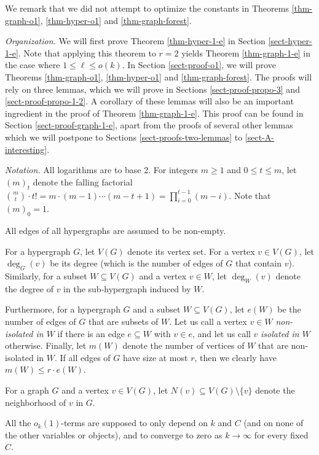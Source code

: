 We remark that we did not attempt to optimize the constants in Theorems \ref{thm-graph-o1}, \ref{thm-hyper-o1} and \ref{thm-graph-forest}.

\noindent\textit{Organization.} We will first prove Theorem \ref{thm-hyper-1-e} in Section \ref{sect-hyper-1-e}. Note that applying this theorem to $r=2$ yields Theorem \ref{thm-graph-1-e} in the case where $1\leq \ell\leq o(k)$. In Section \ref{sect-proof-o1}, we will prove Theorems \ref{thm-graph-o1}, \ref{thm-hyper-o1} and \ref{thm-graph-forest}. The proofs will rely on three lemmas, which we will prove in Sections \ref{sect-proof-propo-3} and \ref{sect-proof-propo-1-2}. A corollary of these lemmas will also be an important ingredient in the proof of Theorem \ref{thm-graph-1-e}. This proof can be found in Section \ref{sect-proof-graph-1-e}, apart from the proofs of several other lemmas which we will postpone to Sections \ref{sect-proofs-two-lemmas} to \ref{sect-A-interesting}.

\noindent\textit{Notation.} All logarithms are to base 2. For integers $m\geq 1$ and $0\leq t\leq m$, let $(m)_t$ denote the falling factorial ${m\choose t}\cdot t!=m\cdot (m-1)\dotsm (m-t+1)=\prod_{i=0}^{t-1}(m-i)$. Note that $(m)_0=1$.

All edges of all hypergraphs are assumed to be non-empty.

For a hypergraph $G$, let $V(G)$ denote its vertex set. For a vertex $v\in V(G)$, let $\deg_G(v)$ be its degree (which is the number of edges of $G$ that contain $v$). Similarly, for a subset $W\subseteq V(G)$ and a vertex $v\in W$, let $\deg_W(v)$ denote the degree of $v$ in the sub-hypergraph induced by $W$.

Furthermore, for a hypergraph $G$ and a subset $W\subseteq V(G)$, let $e(W)$ be the number of edges of $G$ that are subsets of $W$. Let us call a vertex $v\in W$ \emph{non-isolated in $W$} if there is an edge $e\subseteq W$ with $v\in e$, and let us call $v$ \emph{isolated in $W$} otherwise. Finally, let $m(W)$ denote the number of vertices of $W$ that are non-isolated in $W$. If all edges of $G$ have size at most $r$, then we clearly have $m(W)\leq r\cdot e(W)$.

For a graph $G$ and a vertex $v\in V(G)$, let $N(v)\subseteq V(G)\setminus \lbrace v\rbrace$ denote the neighborhood of $v$ in $G$.

All the $o_k(1)$-terms are supposed to only depend on $k$ and $C$ (and on none of the other variables or objects), and to converge to zero as $k\to \infty$ for every fixed $C$.


